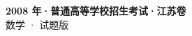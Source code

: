 \documentclass[zihao=-4, a4paper]{ctexart}
\begin{document}
\begin{center}
  {\Large\bfseries 2008 年·普通高等学校招生考试·江苏卷}\\[4pt]
  {\large 数学 · 试题版}
\end{center}
\medskip
{}

\end{document}
